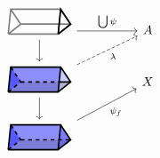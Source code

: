 \[\begin{tikzcd}
	\begin{tikzpicture}[x=2em, y=2em]
    \draw[very thick, black!50]
        (0,0)--(2,0)--(2.1,1)--(0.1,1)--(0,0)
        (2,0)--(2.5,0.4)--(2.1,1)
        (0,0)--(0.5,0.4)--(0.1,1)
        (0.5,0.4)--(2.5,0.4);
	\draw[very thick] (2,0)--(2.5,0.4)--(2.1,1)--(2,0);
    \end{tikzpicture}
	 && A \\
	\begin{tikzpicture}[x=2em, y=2em,baseline=0.5em]
    \begin{scope}[very thick]
    \fill[fill=blue, opacity=0.3]
        (0,0)--(2,0)--(2.1,1)--(0.1,1)--(0,0);
    \fill[fill=blue!50!black, opacity=0.3]
        (0,0)--(0.5,0.4)--(2.5,0.4)--(2,0)--(0,0);
    \fill[fill=blue, opacity=0.2]
        (0.1,1)--(0.5,0.4)--(2.5,0.4)--(2.1,1)--(0.1,1);
    \fill[fill=blue, opacity=0.5]
        (0.1,1)--(0.5,0.4)--(0,0)--(0.1,1);
    \draw
        (0,0)--(2,0)--(2.1,1)--(0.1,1)--(0,0)
        (2,0)--(2.5,0.4)--(2.1,1)
        (2.05,0.4)--(2.5,0.4);
    \draw[dashed]
        (0,0)--(0.5,0.4)--(0.1,1)
        (0.5,0.4)--(2.05,0.4);
    \end{scope}
    \end{tikzpicture}
    && X \\
	\begin{tikzpicture}[x=2em, y=2em,baseline=0.5em]
    \begin{scope}[very thick]
    \fill[fill=blue, opacity=0.3]
        (0,0)--(2,0)--(2.1,1)--(0.1,1)--(0,0);
    \fill[fill=blue!50!black, opacity=0.3]
        (0,0)--(0.5,0.4)--(2.5,0.4)--(2,0)--(0,0);
    \fill[fill=blue, opacity=0.2]
        (0.1,1)--(0.5,0.4)--(2.5,0.4)--(2.1,1)--(0.1,1);
    \fill[fill=blue, opacity=0.5]
        (0.1,1)--(0.5,0.4)--(0,0)--(0.1,1);
    \fill[fill=blue, opacity=0.4]
        (2,0)--(2.5,0.4)--(2.1,1);
    \draw
        (0,0)--(2,0)--(2.1,1)--(0.1,1)--(0,0)
        (2,0)--(2.5,0.4)--(2.1,1);
    \draw[dashed]
        (0,0)--(0.5,0.4)--(0.1,1)
        (0.5,0.4)--(2.5,0.4);
    \end{scope}
    \end{tikzpicture}
	\arrow["\bigcup\psi", from=1-1, to=1-3]
	\arrow[from=1-1, to=2-1]
	\arrow[from=2-1, to=3-1]
	\arrow["{\psi_f}"', from=3-1, to=2-3]
	\arrow["\lambda"', dashed, from=2-1, to=1-3]
\end{tikzcd}\]
